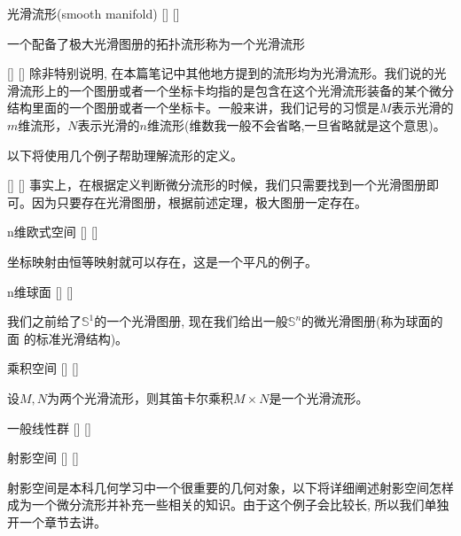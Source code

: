 \documentclass[UTF8]{ctexart}
\begin{document}
    \begin{dfn}
        []
        {光滑流形(smooth manifold)}
        []
        []

       一个配备了极大光滑图册的拓扑流形称为一个光滑流形
    \end{dfn}
    
    \begin{rmk}
        []
        {}
        []
        []
        除非特别说明, 在本篇笔记中其他地方提到的流形均为光滑流形。我们说的光滑流形上的一个图册或者一个坐标卡均指的是包含在这个光滑流形装备的某个微分结构里面的一个图册或者一个坐标卡。一般来讲，我们记号的习惯是$M$表示光滑的$m$维流形，$N$表示光滑的$n$维流形(维数我一般不会省略,一旦省略就是这个意思)。
    \end{rmk}
    
    以下将使用几个例子帮助理解流形的定义。
    
    \begin{rmk}
        []
        {}
        []
        []
        事实上，在根据定义判断微分流形的时候，我们只需要找到一个光滑图册即可。因为只要存在光滑图册，根据前述定理，极大图册一定存在。
    \end{rmk}
    
    \begin{xmp}
        []
        {n维欧式空间}
        []
        []

        坐标映射由恒等映射就可以存在，这是一个平凡的例子。
    \end{xmp}
     
    \begin{xmp}
        []
        {n维球面}
        []
        []

        我们之前给了$\mathbb{S}^1$的一个光滑图册, 现在我们给出一般$\mathbb{S}^n$的微光滑图册(称为球面的面
        的标准光滑结构)。
    \end{xmp}

    \begin{xmp}
        []
        {乘积空间}
        []
        []

        设$M,N$为两个光滑流形，则其笛卡尔乘积$ M\times N$是一个光滑流形。
    \end{xmp}

    \begin{xmp}
        []
        {一般线性群}
        []
        []

        
    \end{xmp}
    
    \begin{xmp}
        []
        {射影空间}
        []
        []

        射影空间是本科几何学习中一个很重要的几何对象，以下将详细阐述射影空间怎样成为一个微分流形并补充一些相关的知识。由于这个例子会比较长, 所以我们单独开一个章节去讲。
    \end{xmp}
\end{document}

